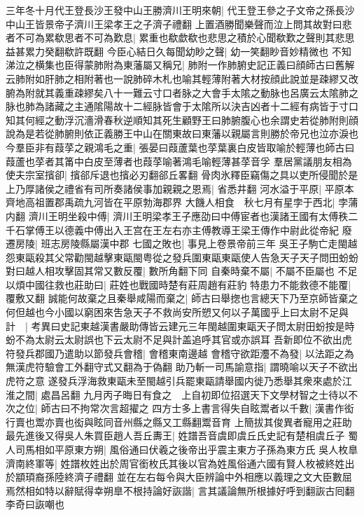 三年冬十月代王登長沙王發中山王勝濟川王明來朝|{
	代王登王參之子文帝之孫長沙中山王皆景帝子濟川王梁孝王之子濟子禮翻}
上置酒勝聞樂聲而泣上問其故對曰悲者不可為累欷思者不可為歎息|{
	累重也欷歔欷也悲思之積於心聞欷歎之聲則其悲思益甚累力癸翻欷許既翻}
今臣心結日久每聞幼眇之聲|{
	幼一笑翻眇音妙精微也}
不知涕泣之横集也臣得蒙肺附為東藩屬又稱兄|{
	肺附一作肺腑史記正義曰顔師古曰舊解云肺附如肝肺之相附著也一說肺碎木札也喻其輕薄附著大材按顔此說並是疎繆又改腑為附就其義重疎繆矣八十一難云寸口者脉之大會手太隂之動脉也呂廣云太隂肺之脉也肺為諸藏之主通隂陽故十二經脉皆會于太隂所以決吉凶者十二經有病皆于寸口知其何經之動浮沉濇滑春秋逆順知其死生顧野王曰肺腑腹心也余謂史若從肺附則顔說為是若從肺腑則依正義勝王中山在關東故曰東藩以親屬言則勝於帝兄也泣亦淚也}
今羣臣非有葭莩之親鴻毛之重|{
	張晏曰葭蘆葉也莩葉裏白皮皆取喻於輕薄也師古曰葭蘆也莩者其筩中白皮至薄者也葭莩喻著鴻毛喻輕薄甚莩音孚}
羣居黨議朋友相為使夫宗室擯卻|{
	擯郤斥退也擯必刃翻郤丘畧翻}
骨肉氷釋臣竊傷之具以吏所侵聞於是上乃厚諸侯之禮省有司所奏諸侯事加親親之恩焉|{
	省悉井翻}
河水溢于平原|{
	平原本齊地高祖置郡禹疏九河皆在平原勃海郡界}
大饑人相食　秋七月有星孛于西北|{
	孛蒲内翻}
濟川王明坐殺中傅|{
	濟川王明梁孝王子應劭曰中傅宦者也漢諸王國有太傅秩二千石掌傅王以德義中傅出入王宫在王左右亦主傅教導王梁王傳作中尉此從帝紀}
廢遷房陵|{
	班志房陵縣屬漢中郡}
七國之敗也|{
	事見上卷景帝前三年}
吳王子駒亡走閩越怨東甌殺其父常勸閩越擊東甌閩粤從之發兵圍東甌東甌使人告急天子天子問田蚡蚡對曰越人相攻擊固其常又數反覆|{
	數所角翻下同}
自秦時棄不屬|{
	不屬不臣屬也}
不足以煩中國往救也莊助曰|{
	莊姓也戰國時楚有莊周趙有莊豹}
特患力不能救德不能覆|{
	覆敷又翻}
誠能何故棄之且秦舉咸陽而棄之|{
	師古曰舉揔也言總天下乃至京師皆棄之}
何但越也今小國以窮困來吿急天子不救尚安所愬又何以子萬國乎上曰太尉不足與計　|{
	考異曰史記東越漢書嚴助傳皆云建元三年閩越圍東甌天子問太尉田蚡按是時蚡不為太尉云太尉誤也下云太尉不足與計盖追呼其官或亦誤耳}
吾新即位不欲出虎符發兵郡國乃遣助以節發兵會稽|{
	會稽東南邊越}
會稽守欲距灋不為發|{
	以法距之為無漢虎符驗會工外翻守式又翻為于偽翻}
助乃斬一司馬諭意指|{
	謂曉喻以天子不欲出虎符之意}
遂發兵浮海救東甌未至閩越引兵罷東甌請舉國内徙乃悉舉其衆來處於江淮之間|{
	處昌呂翻}
九月丙子晦日有食之　上自初即位招選天下文學材智之士待以不次之位|{
	師古曰不拘常次言超擢之}
四方士多上書言得失自眩鬻者以千數|{
	漢書作衒行賣也鬻亦賣也衒與眩同音州縣之縣又工縣翻鬻音育}
上簡拔其俊異者寵用之莊助最先進後又得吳人朱買臣趙人吾丘夀王|{
	姓譜吾音虞即虞丘氏史記有楚相虞丘子}
蜀人司馬相如平原東方朔|{
	風俗通曰伏羲之後帝出乎震主東方子孫為東方氏}
吳人枚臯濟南終軍等|{
	姓譜枚姓出於周官銜枚氏其後以官為姓風俗通六國有賢人枚被終姓出於顓頊裔孫陸終濟子禮翻}
並在左右每令與大臣辨論中外相應以義理之文大臣數屈焉然相如特以辭賦得幸朔臯不根持論好詼諧|{
	言其議論無所根據好呼到翻詼古囘翻李奇曰詼嘲也}
